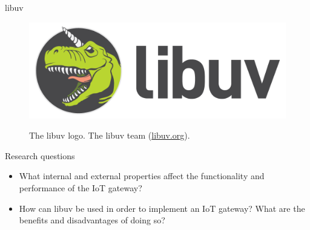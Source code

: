 \documentclass{beamer}
\begin{document}
    \begin{frame}{libuv}

        \begin{figure}
            \centering
            \resizebox{\columnwidth}{!} {
            \includegraphics{libuv.png}
            }
            \caption{The libuv logo. \textcopyright The libuv team (\url{libuv.org}).}
        \end{figure}


    \end{frame}

%
%
%
%

    \begin{frame}{Research questions}

        \begin{itemize}
            \item What internal and external properties affect the
                functionality and performance of the IoT gateway?

            \item How can libuv be used in order to implement an IoT gateway?
                What are the benefits and disadvantages of doing so?
        \end{itemize}

    \end{frame}
\end{document}
